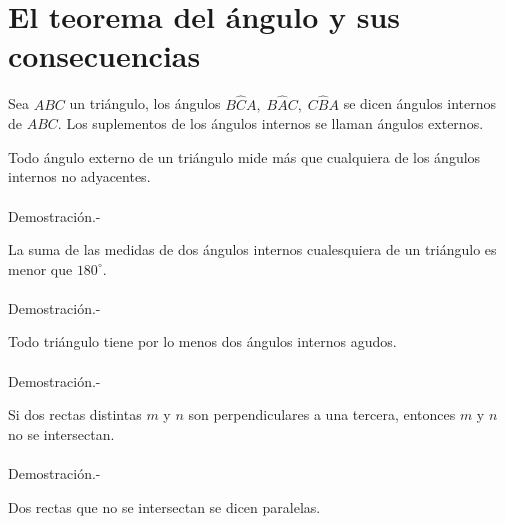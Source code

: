 \chapter{El teorema del ángulo y sus consecuencias}

\begin{tcolorbox}[colframe=white]
    \begin{def.}
	Sea $ABC$ un triángulo, los ángulos $B\widehat{C}A, \; B\widehat{A}C, \; C\widehat{B}A$ se dicen ángulos internos de $ABC$. Los suplementos de los ángulos internos se llaman ángulos externos.
    \end{def.}
\end{tcolorbox}

    \begin{teo}
	Todo ángulo externo de un triángulo mide más que cualquiera de los ángulos internos no adyacentes.\\\\
	    Demostración.-\;
    \end{teo}

    \begin{proposicion}
	La suma de las medidas de dos ángulos internos cualesquiera de un triángulo es menor que $180^{\circ}$.\\\\
	    Demostración.-\;
    \end{proposicion}

    \begin{cor}
	Todo triángulo tiene por lo menos dos ángulos internos agudos.\\\\
	    Demostración.-\;
    \end{cor}

    \begin{cor}
	Si dos rectas distintas $m$ y $n$ son perpendiculares a una tercera, entonces $m$ y $n$ no se intersectan.\\\\
	    Demostración.-\;
    \end{cor}

\begin{tcolorbox}[colframe=white]
    \begin{def.}
	Dos rectas que no se intersectan se dicen paralelas.
    \end{def.}
\end{tcolorbox}

